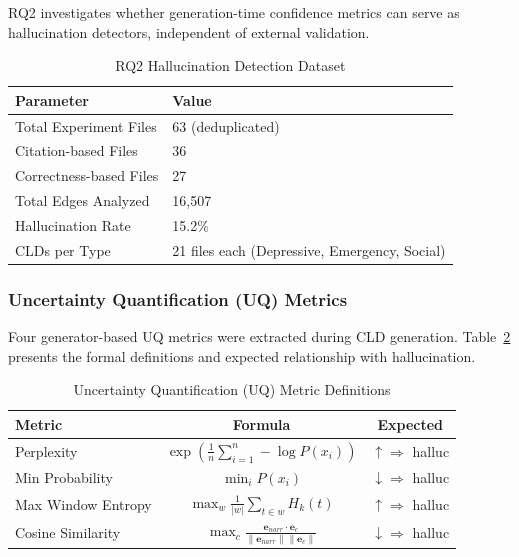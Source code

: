 \documentclass{article}
\begin{document}
RQ2 investigates whether generation-time confidence metrics can serve as hallucination detectors, independent of external validation.

\begin{table}[H]
\centering
\caption{RQ2 Hallucination Detection Dataset}
\label{tab:rq2_dataset}
\begin{tabular}{ll}
\toprule
\textbf{Parameter} & \textbf{Value} \\
\midrule
Total Experiment Files & 63 (deduplicated) \\
Citation-based Files & 36 \\
Correctness-based Files & 27 \\
Total Edges Analyzed & 16,507 \\
Hallucination Rate & 15.2\% \\
CLDs per Type & 21 files each (Depressive, Emergency, Social) \\
\bottomrule
\end{tabular}
\end{table}

\subsubsection{Uncertainty Quantification (UQ) Metrics}

Four generator-based UQ metrics were extracted during CLD generation. Table~\ref{tab:uq_metrics} presents the formal definitions and expected relationship with hallucination.

\begin{table}[H]
\centering
\caption{Uncertainty Quantification (UQ) Metric Definitions}
\label{tab:uq_metrics}
\begin{tabular}{lcc}
\toprule
\textbf{Metric} & \textbf{Formula} & \textbf{Expected} \\
\midrule
Perplexity & $\displaystyle\exp\left(\frac{1}{n}\sum_{i=1}^{n} -\log P(x_i)\right)$ & $\uparrow \Rightarrow$ halluc \\[2ex]
Min Probability & $\displaystyle\min_i P(x_i)$ & $\downarrow \Rightarrow$ halluc \\[2ex]
Max Window Entropy & $\displaystyle\max_w \frac{1}{|w|} \sum_{t \in w} H_k(t)$ & $\uparrow \Rightarrow$ halluc \\[2ex]
Cosine Similarity & $\displaystyle\max_c \frac{\mathbf{e}_{narr} \cdot \mathbf{e}_c}{\|\mathbf{e}_{narr}\| \|\mathbf{e}_c\|}$ & $\downarrow \Rightarrow$ halluc \\
\bottomrule
\end{tabular}
\end{table}
\end{document}
